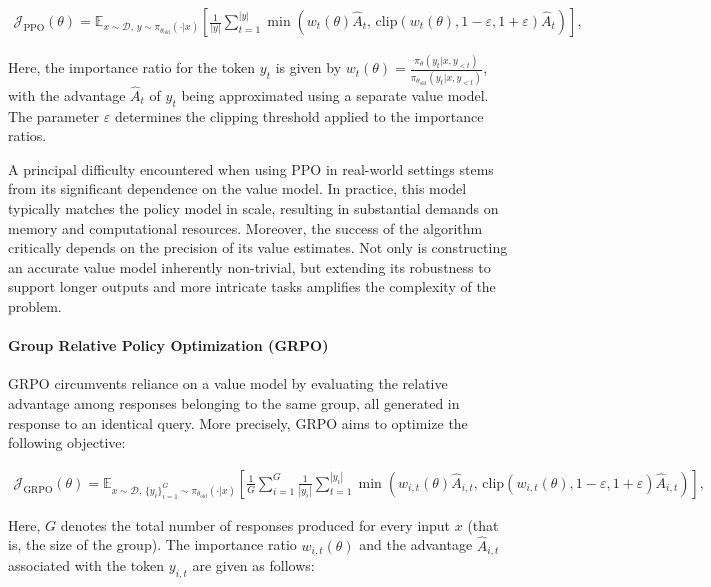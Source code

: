 \begin{align}
\mathcal{J}_\text{PPO}(\theta) = \mathbb{E}_{ x \sim \mathcal{D},\, y \sim \pi_{\theta_\text{old}}( \cdot | x) }
\left[ \frac{1}{|y|} \sum_{t=1}^{|y|} 
\min \left( w_{t}(\theta) \widehat{A}_{t},  \, \mathrm{clip} \left( w_{t}(\theta), 1 - {\varepsilon}, 1 + {\varepsilon}\right) \widehat{A}_{t} \right)
\right],
\end{align}

Here, the importance ratio for the token $y_t$ is given by $
w_{t}(\theta) = \frac{ \pi_{\theta} (y_{t} | x, y_{<t}) }{ \pi_{\theta_\text{old}} (y_{t} | x,y_{<t})} $, with the advantage $\widehat{A}_{t}$ of $y_t$ being approximated using a separate value model. The parameter $\varepsilon$ determines the clipping threshold applied to the importance ratios.

A principal difficulty encountered when using PPO in real-world settings stems from its significant dependence on the value model. In practice, this model typically matches the policy model in scale, resulting in substantial demands on memory and computational resources. Moreover, the success of the algorithm critically depends on the precision of its value estimates. Not only is constructing an accurate value model inherently non-trivial, but extending its robustness to support longer outputs and more intricate tasks amplifies the complexity of the problem.

\paragraph{Group Relative Policy Optimization (GRPO)} GRPO \citep{grpo} circumvents reliance on a value model by evaluating the relative advantage among responses belonging to the same group, all generated in response to an identical query. More precisely, GRPO aims to optimize the following objective:

\begin{align}
\label{equ:grpo}
\mathcal{J}_\text{GRPO}(\theta) = \mathbb{E}_{ x \sim \mathcal{D},\, \{y_i\}_{i=1}^G \sim \pi_{\theta_\text{old}}( \cdot | x) }
\left[ \frac{1}{G} \sum_{i=1}^{G} \frac{1}{|y_i|} \sum_{t=1}^{|y_i|} 
\min \left( w_{i,t}(\theta) \widehat{A}_{i,t},  \, \mathrm{clip} \left( w_{i,t}(\theta), 1 - {\varepsilon}, 1 + {\varepsilon}\right) \widehat{A}_{i,t} \right)
\right],
\end{align}

Here, $G$ denotes the total number of responses produced for every input $x$ (that is, the size of the group). The importance ratio $w_{i,t}(\theta)$ and the advantage $\widehat{A}_{i,t}$ associated with the token $y_{i,t}$ are given as follows:


